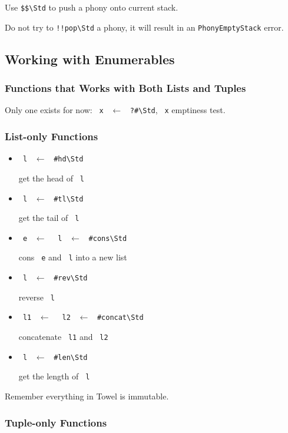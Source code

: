 \documentclass{report}
\newcommand{\mstd}[1]{\texttt{#1\textbackslash Std}}
\newcommand{\mtilde}[1]{\textasciitilde}
\newcommand{\marg}[1]{\texttt{\mtilde ~#1}}
\newcommand{\mla}[0]{~$\leftarrow$ ~}
\begin{document}
Use \mstd{\$\$} to push a phony onto current stack.

\begin{mdframed}[style=warning]
  Do not try to \mstd{!!pop} a phony, it will result in an \texttt{PhonyEmptyStack} error.
\end{mdframed}

\subsection{Working with Enumerables}


\subsubsection{Functions that Works with Both Lists and Tuples}

Only one exists for now: \marg{x} \mla \mstd{?\#}, \marg{x} emptiness test.

\subsubsection{List-only Functions}

\begin{itemize}
\item \marg{l} \mla \mstd{\#hd}

get the head of \marg{l}
\item \marg{l} \mla \mstd{\#tl}

get the tail of \marg{l}
\item \marg{e} \mla \marg{l} \mla \mstd{\#cons}

cons \marg{e} and \marg{l} into a new list
\item \marg{l} \mla \mstd{\#rev}

reverse \marg{l}
\item \marg{l1} \mla \marg{l2} \mla \mstd{\#concat}

concatenate \marg{l1} and \marg{l2}
\item \marg{l} \mla \mstd{\#len}

get the length of \marg{l}
\end{itemize}

\begin{mdframed}[style=hint]
  Remember everything in Towel is immutable.
\end{mdframed}

\subsubsection{Tuple-only Functions}
\end{document}
